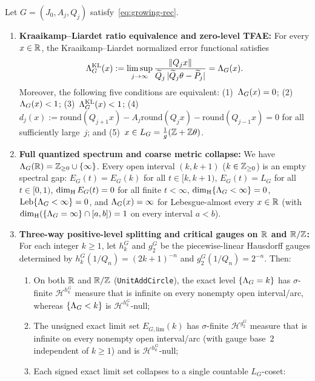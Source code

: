 \begin{theorem}\label{thm:growing-rec-spectrum}
Let $G=(J_0,A_j,Q_j)$ satisfy~\eqref{eq:growing-rec}.
\begin{enumerate}[label=(\roman*),leftmargin=2.2em]
\item \textbf{Kraaikamp--Liardet ratio equivalence and zero-level TFAE:}
For every $x\in\mathbb{R}$, the Kraaikamp--Liardet normalized error functional satisfies
\[
\Lambda_G^{\mathrm{KL}}(x)
:=\limsup_{j\to\infty}\frac{\|Q_j x\|}{\widetilde Q_j\,|\widetilde Q_j\theta-\widetilde P_j|}
=\Lambda_G(x).
\]
Moreover, the following five conditions are equivalent:
\textup{(1)}~$\Lambda_G(x)=0$; \textup{(2)}~$\Lambda_G(x)<1$;
\textup{(3)}~$\Lambda_G^{\mathrm{KL}}(x)<1$;
\textup{(4)}~$d_j(x):=\mathrm{round}(Q_{j+1}x)-A_j\mathrm{round}(Q_j x)-\mathrm{round}(Q_{j-1}x)=0$ for all sufficiently large~$j$; and
\textup{(5)}~$x\in L_G=\frac{1}{g}(\mathbb{Z}+\mathbb{Z}\theta)$.
\item \textbf{Full quantized spectrum and coarse metric collapse:}
We have $\Lambda_G(\mathbb{R})=\mathbb{Z}_{\ge0}\cup\{\infty\}$. Every open interval $(k,k+1)$
($k\in\mathbb{Z}_{\ge0}$) is an empty spectral gap: $E_G(t)=E_G(k)$ for all $t\in[k,k+1)$,
$E_G(t)=L_G$ for all $t\in[0,1)$, $\dim_{\mathrm{H}} E_G(t)=0$ for all finite $t<\infty$,
$\dim_{\mathrm{H}}\{\Lambda_G<\infty\}=0$, $\operatorname{Leb}\{\Lambda_G<\infty\}=0$, and
$\Lambda_G(x)=\infty$ for Lebesgue-almost every $x\in\mathbb{R}$ (with
$\dim_{\mathrm{H}}(\{\Lambda_G=\infty\}\cap[a,b])=1$ on every interval $a<b$).
\item \textbf{Three-way positive-level splitting and critical gauges on $\mathbb{R}$ and $\mathbb{R}/\mathbb{Z}$:}
For each integer $k\ge1$, let $h_k^G$ and $g_2^G$ be the piecewise-linear Hausdorff
gauges determined by $h_k^G(1/Q_n)=(2k+1)^{-n}$ and $g_2^G(1/Q_n)=2^{-n}$. Then:
\begin{enumerate}[label=(\alph*),leftmargin=1.6em]
\item On both $\mathbb{R}$ and $\mathbb{R}/\mathbb{Z}$ (\texttt{UnitAddCircle}), the exact level
$\{\Lambda_G=k\}$ has $\sigma$-finite $\mathcal H^{h_k^G}$ measure that is infinite
on every nonempty open interval/arc, whereas $\{\Lambda_G<k\}$ is
$\mathcal H^{h_k^G}$-null;
\item The unsigned exact limit set $E_{G,\mathrm{lim}}(k)$ has $\sigma$-finite
$\mathcal H^{g_2^G}$ measure that is infinite on every nonempty open interval/arc
(with gauge base~$2$ independent of $k\ge1$) and is $\mathcal H^{h_k^G}$-null;
\item Each signed exact limit set collapses to a single countable $L_G$-coset:

\end{enumerate}
\end{enumerate}
\end{theorem}
